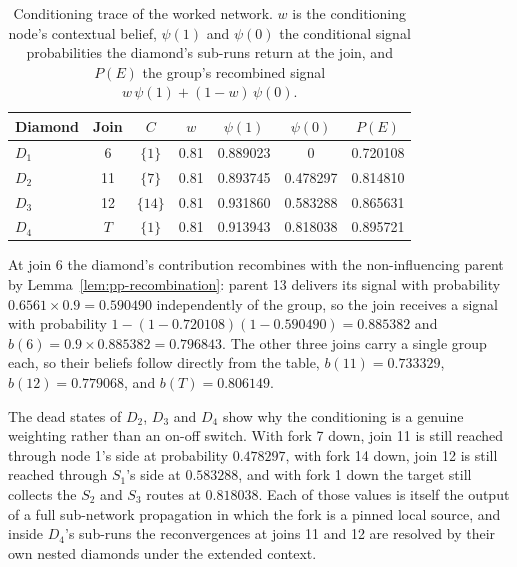 \documentclass[12pt]{report}
\begin{document}
\begin{table}[htbp]
\centering
\caption{Conditioning trace of the worked network. $w$ is the conditioning node's contextual belief, $\psi(1)$ and $\psi(0)$ the conditional signal probabilities the diamond's sub-runs return at the join, and $P(E)$ the group's recombined signal $w\,\psi(1) + (1-w)\,\psi(0)$.}
\label{tab:pp-trace}
\small
\renewcommand{\arraystretch}{1.2}
\begin{tabular}{lcccccc}
\toprule
Diamond & Join & $C$ & $w$ & $\psi(1)$ & $\psi(0)$ & $P(E)$ \\
\midrule
$D_1$ & 6  & $\{1\}$  & 0.81 & 0.889023 & 0        & 0.720108 \\
$D_2$ & 11 & $\{7\}$  & 0.81 & 0.893745 & 0.478297 & 0.814810 \\
$D_3$ & 12 & $\{14\}$ & 0.81 & 0.931860 & 0.583288 & 0.865631 \\
$D_4$ & $T$ & $\{1\}$ & 0.81 & 0.913943 & 0.818038 & 0.895721 \\
\bottomrule
\end{tabular}
\end{table}

At join 6 the diamond's contribution recombines with the non-influencing parent by Lemma~\ref{lem:pp-recombination}: parent 13 delivers its signal with probability $0.6561 \times 0.9 = 0.590490$ independently of the group, so the join receives a signal with probability $1 - (1 - 0.720108)(1 - 0.590490) = 0.885382$ and $b(6) = 0.9 \times 0.885382 = 0.796843$. The other three joins carry a single group each, so their beliefs follow directly from the table, $b(11) = 0.733329$, $b(12) = 0.779068$, and $b(T) = 0.806149$.

The dead states of $D_2$, $D_3$ and $D_4$ show why the conditioning is a genuine weighting rather than an on-off switch. With fork 7 down, join 11 is still reached through node 1's side at probability $0.478297$, with fork 14 down, join 12 is still reached through $S_1$'s side at $0.583288$, and with fork 1 down the target still collects the $S_2$ and $S_3$ routes at $0.818038$. Each of those values is itself the output of a full sub-network propagation in which the fork is a pinned local source, and inside $D_4$'s sub-runs the reconvergences at joins 11 and 12 are resolved by their own nested diamonds under the extended context.
\end{document}

